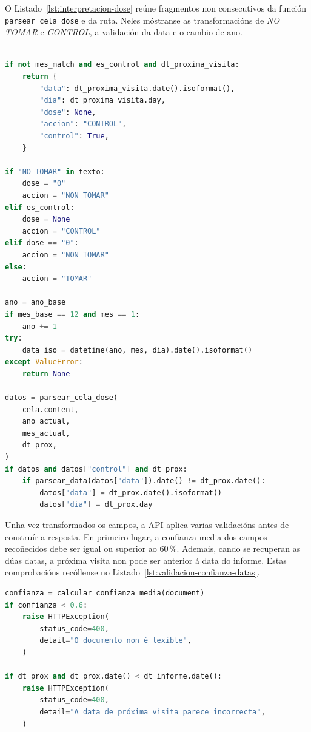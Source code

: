 O Listado~\ref{lst:interpretacion-dose} reúne fragmentos non consecutivos da función \texttt{parsear\_cela\_dose} e da ruta. Neles móstranse as transformacións de \textit{NO TOMAR} e \textit{CONTROL}, a validación da data e o cambio de ano.


\begin{lstlisting}[language=Python,
    caption={Tratamento das doses e dos días de control.},
    label={lst:interpretacion-dose}]
    
if not mes_match and es_control and dt_proxima_visita:
    return {
        "data": dt_proxima_visita.date().isoformat(),
        "dia": dt_proxima_visita.day,
        "dose": None,
        "accion": "CONTROL",
        "control": True,
    }

if "NO TOMAR" in texto:
    dose = "0"
    accion = "NON TOMAR"
elif es_control:
    dose = None
    accion = "CONTROL"
elif dose == "0":
    accion = "NON TOMAR"
else:
    accion = "TOMAR"

ano = ano_base
if mes_base == 12 and mes == 1:
    ano += 1
try:
    data_iso = datetime(ano, mes, dia).date().isoformat()
except ValueError:
    return None

datos = parsear_cela_dose(
    cela.content,
    ano_actual,
    mes_actual,
    dt_prox,
)
if datos and datos["control"] and dt_prox:
    if parsear_data(datos["data"]).date() != dt_prox.date():
        datos["data"] = dt_prox.date().isoformat()
        datos["dia"] = dt_prox.day
\end{lstlisting}

Unha vez transformados os campos, a API aplica varias validacións antes de construír a resposta. En primeiro lugar, a confianza media dos campos
recoñecidos debe ser igual ou superior ao 60\,\%. Ademais, cando se recuperan as dúas datas, a próxima visita non pode ser anterior á data do informe. Estas comprobacións recóllense no Listado~\ref{lst:validacion-confianza-datas}.

\begin{lstlisting}[language=Python,
    caption={Validación da confianza global e da orde das datas.},
    label={lst:validacion-confianza-datas}]
confianza = calcular_confianza_media(document)
if confianza < 0.6:
    raise HTTPException(
        status_code=400,
        detail="O documento non é lexible",
    )

if dt_prox and dt_prox.date() < dt_informe.date():
    raise HTTPException(
        status_code=400,
        detail="A data de próxima visita parece incorrecta",
    )
\end{lstlisting}

